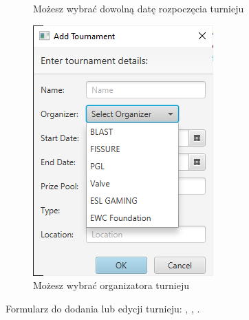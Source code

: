 \begin{figure}[H]
\begin{subfigure}{0.3\textwidth}
        \caption{Możesz wybrać dowolną datę rozpoczęcia turnieju \label{fig:tournament_selection_fxml_edit}}
    \end{subfigure}
    \begin{subfigure}{0.3\textwidth}
        \centering
        \includegraphics[width=.8\linewidth]{figures/SelectingOrganizer.png}
        \caption{Możesz wybrać organizatora turnieju \label{fig:tournament_selection_fxml_add_offline}}
    \end{subfigure}
    \caption{Formularz do dodania lub edycji turnieju: \protect{}, \protect{}, \protect{}. \label{fig:tournament_selection_fxml_form}}
\end{figure}
